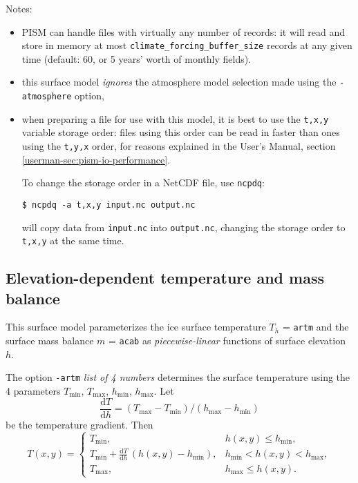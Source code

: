 \documentclass[titlepage,letterpaper,final]{scrartcl}
\def\optsection#1{%
  \def\optindex##1{\index[options]{#1!##1}}
  \def\optseealso##1{\index[options]{#1|see{##1}}}
}
\newcommand{\txtopt}[2]{\texttt{-#1} #2\optindex{\texttt{-#1} #2}}
\begin{document}
\noindent Notes:
\begin{itemize}
\item PISM can handle files with virtually any number of records: it will
  read and store in memory at most \texttt{climate_forcing_buffer_size} records
  at any given time (default: 60, or 5 years' worth of monthly fields).
\item this surface model \emph{ignores} the atmosphere model selection made
  using the \texttt{-atmosphere} option,
\item when preparing a file for use with this model, it is best to use the \texttt{t,x,y} variable storage order: files using this order can be read in faster than ones using the \texttt{t,y,x} order, for reasons explained in the User's Manual, section \ref*{userman-sec:pism-io-performance}.

  To change the storage order in a NetCDF file, use \texttt{ncpdq}:
\begin{verbatim}
$ ncpdq -a t,x,y input.nc output.nc
\end{verbatim}%
  will copy data from \texttt{input.nc} into \texttt{output.nc}, changing the storage order to \texttt{t,x,y} at the same time.
\end{itemize}

\subsection{Elevation-dependent temperature and mass balance}
\label{sec:surface-elev-depend-temp}
\optsection{\surface!\texttt{elevation}}

\newcommand{\var}[2]{ {#1}_{\text{#2}} }
\newcommand{\h}[1]{ \var{h}{#1} }
\newcommand{\T}[1]{ \var{T}{#1} }
\newcommand{\m}[1]{ \var{m}{#1} }
\newcommand{\ms}[1]{ \var{m^{*}}{#1} }
\newcommand{\diff}[2]{ \frac{\mathrm{d}#1}{\mathrm{d}#2} }

This surface model parameterizes the ice surface temperature $T_{h}$ = \texttt{artm} and the surface mass balance $m$ = \texttt{acab} as \emph{piecewise-linear} functions of surface elevation $h$.

The option \txtopt{artm}{\emph{list of 4 numbers}} determines the surface temperature using the 4 parameters $\T{min}$, $\T{max}$, $\h{min}$, $\h{max}$. Let
\begin{equation}
  \diff{T}{h} = (\T{max} - \T{min}) / (\h{max} - \h{min})
\end{equation}
be the temperature gradient. Then
\begin{equation}
  T(x,y) =
  \begin{cases}
    \T{min}, & h(x,y) \le \h{min}, \\
    \T{min} + \diff{T}{h} \, (h(x,y) - \h{min}), & \h{min} < h(x,y) < \h{max}, \\
    \T{max}, & \h{max} \le h(x,y).
  \end{cases}
\end{equation}
\end{document}
